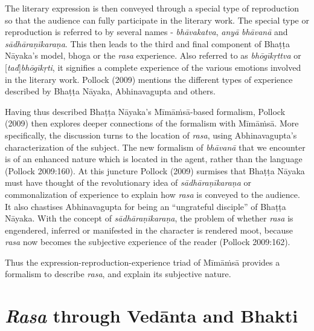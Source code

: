 The literary expression is then conveyed through a special type of reproduction so that the audience can fully participate in the literary work. The special type or reproduction is referred to by several names - \textsl{bhāvakatva}, \textsl{anyā} \textsl{bhāvanā} and \textsl{sādhāraṇīkaraṇa}. This then leads to the third and final component of Bhaṭṭa Nāyaka’s model, bhoga or the \textsl{rasa} experience. Also referred to as \textsl{bhōgīkṛttva} or [\textsl{tad}]\textsl{bhōgīkṛti}, it signifies a complete experience of the various emotions involved in the literary work. Pollock (2009) mentions the different types of experience described by Bhaṭṭa Nāyaka, Abhinavagupta and others. 

Having thus described Bhaṭṭa Nāyaka’s Mīmāṁsā-based formalism, Pollock (2009) then explores deeper connections of the formalism with Mīmāṁsā. More specifically, the discussion turns to the location of \textsl{rasa}, using Abhinavagupta’s characterization of the subject. The new formalism of \textsl{bhāvanā} that we encounter is of an enhanced nature which is located in the agent, rather than the language (Pollock 2009:160). At this juncture Pollock (2009) surmises that Bhaṭṭa Nāyaka must have thought of the revolutionary idea of \textsl{sādhāraṇīkaraṇa} or commonalization of experience to explain how \textsl{rasa} is conveyed to the audience. It also chastises Abhinavagupta for being an “ungrateful disciple” of Bhaṭṭa Nāyaka. With the concept of \textsl{sādhāraṇīkaraṇa}, the problem of whether \textsl{rasa} is engendered, inferred or manifested in the character is rendered moot, because \textsl{rasa} now becomes the subjective experience of the reader (Pollock 2009:162).

Thus the expression-reproduction-experience triad of Mīmāṁsā provides a formalism to describe \textsl{rasa}, and explain its subjective nature.\\[-20pt] 

\section*{\textsl{Rasa} through Vedānta and Bhakti}

